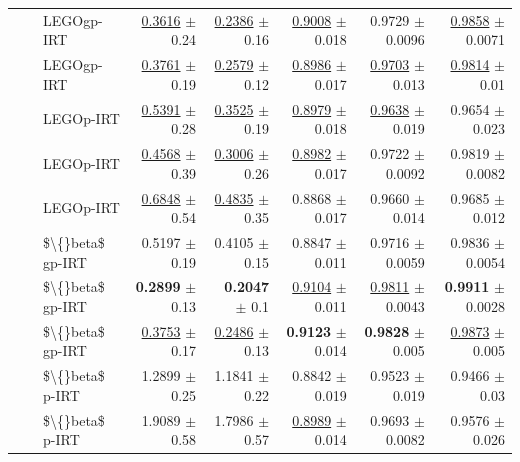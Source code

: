\begin{longtable}{llp{}rrrrr}
 &  & LEGOgp-IRT & \underline{0.3616} {\scriptsize $\pm$ 0.24} & \underline{0.2386} {\scriptsize $\pm$ 0.16} & \underline{0.9008} {\scriptsize $\pm$ 0.018} & 0.9729 {\scriptsize $\pm$ 0.0096} & \underline{0.9858} {\scriptsize $\pm$ 0.0071} \\
 &  & LEGOgp-IRT & \underline{0.3761} {\scriptsize $\pm$ 0.19} & \underline{0.2579} {\scriptsize $\pm$ 0.12} & \underline{0.8986} {\scriptsize $\pm$ 0.017} & \underline{0.9703} {\scriptsize $\pm$ 0.013} & \underline{0.9814} {\scriptsize $\pm$ 0.01} \\
 &  & LEGOp-IRT & \underline{0.5391} {\scriptsize $\pm$ 0.28} & \underline{0.3525} {\scriptsize $\pm$ 0.19} & \underline{0.8979} {\scriptsize $\pm$ 0.018} & \underline{0.9638} {\scriptsize $\pm$ 0.019} & 0.9654 {\scriptsize $\pm$ 0.023} \\
 &  & LEGOp-IRT & \underline{0.4568} {\scriptsize $\pm$ 0.39} & \underline{0.3006} {\scriptsize $\pm$ 0.26} & \underline{0.8982} {\scriptsize $\pm$ 0.017} & 0.9722 {\scriptsize $\pm$ 0.0092} & 0.9819 {\scriptsize $\pm$ 0.0082} \\
 &  & LEGOp-IRT & \underline{0.6848} {\scriptsize $\pm$ 0.54} & \underline{0.4835} {\scriptsize $\pm$ 0.35} & 0.8868 {\scriptsize $\pm$ 0.017} & 0.9660 {\scriptsize $\pm$ 0.014} & 0.9685 {\scriptsize $\pm$ 0.012} \\
 &  & \$\textbackslash\{\}beta\$ gp-IRT & 0.5197 {\scriptsize $\pm$ 0.19} & 0.4105 {\scriptsize $\pm$ 0.15} & 0.8847 {\scriptsize $\pm$ 0.011} & 0.9716 {\scriptsize $\pm$ 0.0059} & 0.9836 {\scriptsize $\pm$ 0.0054} \\
 &  & \$\textbackslash\{\}beta\$ gp-IRT & \textbf{0.2899} {\scriptsize $\pm$ 0.13} & \textbf{0.2047} {\scriptsize $\pm$ 0.1} & \underline{0.9104} {\scriptsize $\pm$ 0.011} & \underline{0.9811} {\scriptsize $\pm$ 0.0043} & \textbf{0.9911} {\scriptsize $\pm$ 0.0028} \\
 &  & \$\textbackslash\{\}beta\$ gp-IRT & \underline{0.3753} {\scriptsize $\pm$ 0.17} & \underline{0.2486} {\scriptsize $\pm$ 0.13} & \textbf{0.9123} {\scriptsize $\pm$ 0.014} & \textbf{0.9828} {\scriptsize $\pm$ 0.005} & \underline{0.9873} {\scriptsize $\pm$ 0.005} \\
 &  & \$\textbackslash\{\}beta\$ p-IRT & 1.2899 {\scriptsize $\pm$ 0.25} & 1.1841 {\scriptsize $\pm$ 0.22} & 0.8842 {\scriptsize $\pm$ 0.019} & 0.9523 {\scriptsize $\pm$ 0.019} & 0.9466 {\scriptsize $\pm$ 0.03} \\
 &  & \$\textbackslash\{\}beta\$ p-IRT & 1.9089 {\scriptsize $\pm$ 0.58} & 1.7986 {\scriptsize $\pm$ 0.57} & \underline{0.8989} {\scriptsize $\pm$ 0.014} & 0.9693 {\scriptsize $\pm$ 0.0082} & 0.9576 {\scriptsize $\pm$ 0.026} \\

\end{longtable}
